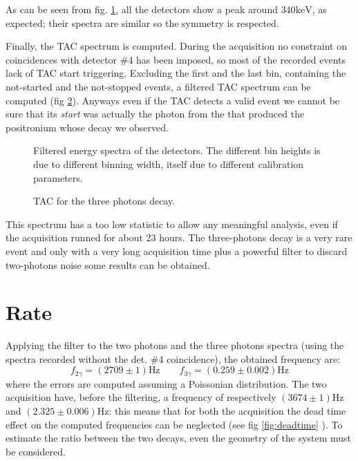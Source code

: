 \documentclass[11pt,a4 paper]{article}
\begin{document}
As can be seen from fig. \ref{fig:alldet:3gamma}, all the detectors show a peak around $340\si{\kilo\electronvolt}$, as expected; their spectra are similar so the symmetry is respected.

Finally, the TAC spectrum is computed. During the acquisition no constraint on coincidences with detector \#4 has been imposed, so most of the recorded events lack of TAC start triggering. Excluding the first and the last bin, containing the not-started and the not-stopped events, a filtered TAC spectrum can be computed (fig \ref{fig:tac:3gamma}).
Anyways even if the TAC detects a valid event we cannot be sure that its \emph{start} was actually the photon from the  that produced the positronium whose decay we observed.

\begin{figure}[H]
    \centering
    \caption{Filtered energy spectra of the detectors. The different bin heights is due to different binning width, itself due to different calibration parameters.}
    \label{fig:alldet:3gamma}
\end{figure}

\begin{figure}[H]
    \centering
    \caption{TAC for the three photons decay.}
    \label{fig:tac:3gamma}
\end{figure}


This spectrum has a too low statistic to allow any meaningful analysis, even if the acquisition runned for about 23 hours. The three-photons decay is a very rare event and only with a very long acquisition time plus a powerful filter to discard two-photons noise some results can be obtained.

\section{Rate}

Applying the filter to the two photons and the three photons spectra (using the spectra recorded without the det. \#4 coincidence), the obtained frequency are:
\begin{equation*}
    f_{2\gamma} = (2709 \pm 1)\si{\hertz} \qquad f_{3\gamma} = (0.259 \pm 0.002)\si{\hertz}
\end{equation*}
where the errors are computed assuming a Poissonian distribution. The two acquisition have, before the filtering, a frequency of respectively $(3674\pm1)\si{\hertz}$ and $(2.325\pm0.006)\si{\hertz}$: this means that for both the acquisition the dead time effect on the computed frequencies can be neglected (see fig \ref{fig:deadtime} ). To estimate the ratio between the two decays, even the geometry of the system must be considered.
\end{document}
